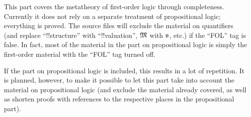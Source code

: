 \documentclass[../../include/open-logic-part]{subfiles}
\begin{document}

\begin{editorial}
  This part covers the metatheory of first-order logic through
  completeness.  Currently it does not rely on a separate treatment of
  propositional logic; everything is proved.  The source files will
  exclude the material on quantifiers (and replace ``!!{structure}''
  with ``!!{valuation}'', $\Struct{M}$ with $\pAssign{v}$, etc.) if
  the ``FOL'' tag is false. In fact, most of the material in the part
  on propositional logic is simply the first-order material with the
  ``FOL'' tag turned off.

  If the part on propositional logic is included, this results in a
  lot of repetition. It is planned, however, to make it possible to
  let this part take into account the material on propositional logic
  (and exclude the material already covered, as well as shorten proofs
  with references to the respective places in the propositional
  part).
\end{editorial}












\OLEndPartHook
\end{document}
